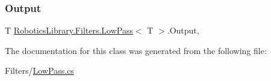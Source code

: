 \mbox{\label{class_robotics_library_1_1_filters_1_1_low_pass_a83f66e4bfd6737c56614f3bb9a73876f}} 
\subsubsection{\texorpdfstring{Output}{Output}}
{\footnotesize\ttfamily T \hyperlink{class_robotics_library_1_1_filters_1_1_low_pass}{Robotics\+Library.\+Filters.\+Low\+Pass}$<$ T $>$.Output\hspace{0.3cm}{\ttfamily [get]}, {}}



The documentation for this class was generated from the following file\+:\begin{DoxyCompactItemize}
\item 
Filters/\hyperlink{_low_pass_8cs}{Low\+Pass.\+cs}\end{DoxyCompactItemize}
